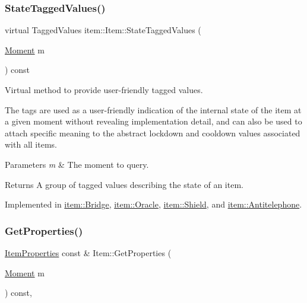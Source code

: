 \mbox{\label{classitem_1_1_item_a8410ab3ab75e65360eddb4f6bd3cceff}} 
\subsubsection{\texorpdfstring{State\+Tagged\+Values()}{StateTaggedValues()}}
{\footnotesize\ttfamily virtual Tagged\+Values item\+::\+Item\+::\+State\+Tagged\+Values (\begin{DoxyParamCaption}\item[{\hyperlink{classtimeplane_1_1_moment}{Moment}}]{m }\end{DoxyParamCaption}) const\hspace{0.3cm}{\ttfamily [pure virtual]}}



Virtual method to provide user-\/friendly tagged values. 

The tags are used as a user-\/friendly indication of the internal state of the item at a given moment without revealing implementation detail, and can also be used to attach specific meaning to the abstract lockdown and cooldown values associated with all items. 
\begin{DoxyParams}{Parameters}
{\em m} & The moment to query. \\
\hline
\end{DoxyParams}
\begin{DoxyReturn}{Returns}
A group of tagged values describing the state of an item. 
\end{DoxyReturn}


Implemented in \hyperlink{classitem_1_1_bridge_a6339e1cd46f454625ef7cd6dc683f6cd}{item\+::\+Bridge}, \hyperlink{classitem_1_1_oracle_a78dd3984a5a0dae432c86e18520d7c46}{item\+::\+Oracle}, \hyperlink{classitem_1_1_shield_a1a246374ed47a4d9849bad97091c42cb}{item\+::\+Shield}, and \hyperlink{classitem_1_1_antitelephone_afe8ac703b5f19181f221afe07c05cae7}{item\+::\+Antitelephone}.

\mbox{\label{classitem_1_1_item_a23790dceafc9e3f8950f69380cc4c4aa}} 
\subsubsection{\texorpdfstring{Get\+Properties()}{GetProperties()}}
{\footnotesize\ttfamily \hyperlink{classitem_1_1_item_properties}{Item\+Properties} const  \& Item\+::\+Get\+Properties (\begin{DoxyParamCaption}\item[{\hyperlink{classtimeplane_1_1_moment}{Moment}}]{m }\end{DoxyParamCaption}) const\hspace{0.3cm}{\ttfamily [inline]}, {\ttfamily [protected]}}



